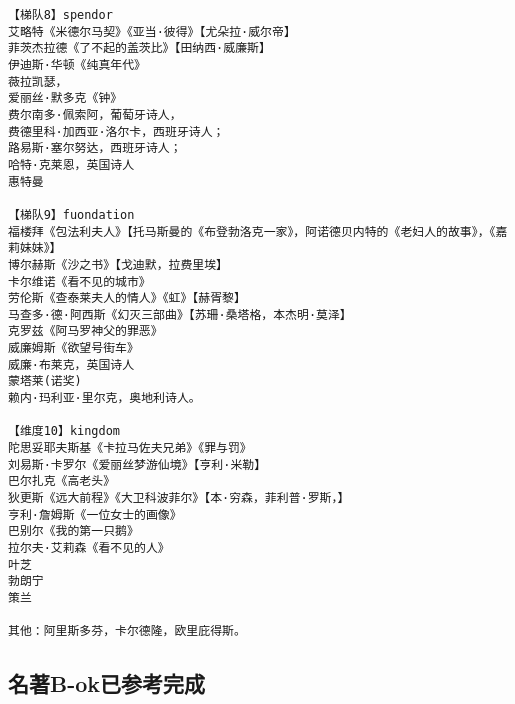 \documentclass[UTF8]{../../RepresentationUniverse}
\begin{document}
\begin{lstlisting}
【梯队8】spendor
艾略特《米德尔马契》《亚当·彼得》【尤朵拉·威尔帝】
菲茨杰拉德《了不起的盖茨比》【田纳西·威廉斯】
伊迪斯·华顿《纯真年代》
薇拉凯瑟，
爱丽丝·默多克《钟》
费尔南多·佩索阿，葡萄牙诗人，
费德里科·加西亚·洛尔卡，西班牙诗人；
路易斯·塞尔努达，西班牙诗人；
哈特·克莱恩，英国诗人
惠特曼

【梯队9】fuondation
福楼拜《包法利夫人》【托马斯曼的《布登勃洛克一家》，阿诺德贝内特的《老妇人的故事》，《嘉莉妹妹》】
博尔赫斯《沙之书》【戈迪默，拉费里埃】
卡尔维诺《看不见的城市》
劳伦斯《查泰莱夫人的情人》《虹》【赫胥黎】
马查多·德·阿西斯《幻灭三部曲》【苏珊·桑塔格，本杰明·莫泽】
克罗兹《阿马罗神父的罪恶》
威廉姆斯《欲望号街车》
威廉·布莱克，英国诗人
蒙塔莱(诺奖) 
赖内·玛利亚·里尔克，奥地利诗人。

【维度10】kingdom
陀思妥耶夫斯基《卡拉马佐夫兄弟》《罪与罚》
刘易斯·卡罗尔《爱丽丝梦游仙境》【亨利·米勒】
巴尔扎克《高老头》
狄更斯《远大前程》《大卫科波菲尔》【本·穷森，菲利普·罗斯，】
亨利·詹姆斯《一位女士的画像》
巴别尔《我的第一只鹅》
拉尔夫·艾莉森《看不见的人》
叶芝
勃朗宁
策兰

其他：阿里斯多芬，卡尔德隆，欧里庇得斯。
\end{lstlisting}


\subsection{名著B-ok已参考完成}
\end{document}
